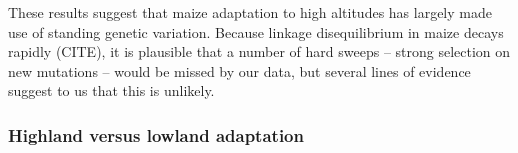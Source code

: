 {{{These results suggest that maize adaptation to high altitudes has largely made use of standing genetic variation. 
Because linkage disequilibrium in maize decays rapidly (CITE), it is plausible that a number of hard sweeps -- strong selection on new mutations -- would be missed by our data, but several lines of evidence suggest to us that this is unlikely.  

\subsubsection{Highland versus lowland adaptation}  

}}}
